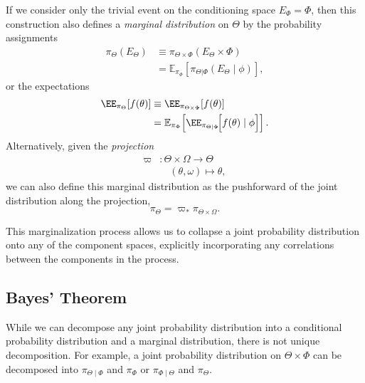 If we consider only the trivial event on the conditioning space $E_{\Phi} 
= \Phi$, then this construction also defines a  \emph{marginal distribution} 
on $\Theta$ by the probability assignments
%
\begin{align*}
\pi_{\Theta} \! \left( E_{\Theta} \right)
&\equiv
\pi_{\Theta \times \Phi} \! \left( E_{\Theta} \times \Phi \right) \\
&=
\mathbb{E}_{\pi_{\Phi}} \! \left[  
\pi_{\Theta|\Phi} \! \left( E_{\Theta} \mid \phi \right)
\right],
\end{align*}
or the expectations
%
\begin{align*}
\EE_{\pi_{\Theta}} \! \left[ f \! \left( \theta \right) \right]
&\equiv
\EE_{\pi_{\Theta \times \Phi}} \! \left[ f \! \left( \theta \right) \right] \\
&=
\mathbb{E}_{\pi_{\Phi}} \! \left[  
\EE_{\pi_{\Theta|\Phi}} \! \Big[ 
f \! \left( \theta \right) \mid \phi 
\Big]
\right].
\end{align*}
%
Alternatively, given the \emph{projection}
%
\begin{align*}
\varpi &: \Theta \times \Omega \rightarrow \Theta \\
& \quad \left( \theta, \omega \right) \mapsto \theta,
\end{align*}
%
we can also define this marginal distribution as the pushforward
of the joint distribution along the projection,
%
\begin{equation*}
\pi_{\Theta} = \varpi_{*} \pi_{\Theta \times \Omega}.
\end{equation*}

This marginalization process allows us to collapse a joint probability 
distribution onto any of the component spaces, explicitly incorporating 
any correlations between the components in the process.

\subsection{Bayes' Theorem}

While we can decompose any joint probability distribution into a 
conditional probability distribution and a marginal distribution, there 
is not unique decomposition.  For example, a joint probability distribution 
on $\Theta \times \Phi$ can be decomposed into $\pi_{\Theta \mid \Phi}$ 
and $\pi_{\Phi}$ or $\pi_{\Phi \mid \Theta}$ and $\pi_{\Theta}$.

